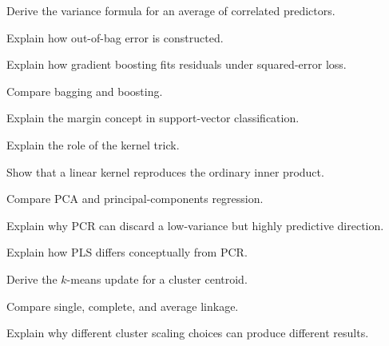 \begin{exercise}[3]
Derive the variance formula for an average of correlated predictors.
\end{exercise}

\begin{exercise}[3]
Explain how out-of-bag error is constructed.
\end{exercise}

\begin{exercise}[3]
Explain how gradient boosting fits residuals under squared-error loss.
\end{exercise}

\begin{exercise}[3]
Compare bagging and boosting.
\end{exercise}

\begin{exercise}[3]
Explain the margin concept in support-vector classification.
\end{exercise}

\begin{exercise}[3]
Explain the role of the kernel trick.
\end{exercise}

\begin{exercise}[3]
Show that a linear kernel reproduces the ordinary inner product.
\end{exercise}

\begin{exercise}[3]
Compare PCA and principal-components regression.
\end{exercise}

\begin{exercise}[3]
Explain why PCR can discard a low-variance but highly predictive
direction.
\end{exercise}

\begin{exercise}[3]
Explain how PLS differs conceptually from PCR.
\end{exercise}

\begin{exercise}[3]
Derive the \(k\)-means update for a cluster centroid.
\end{exercise}

\begin{exercise}[3]
Compare single, complete, and average linkage.
\end{exercise}

\begin{exercise}[3]
Explain why different cluster scaling choices can produce different
results.
\end{exercise}

